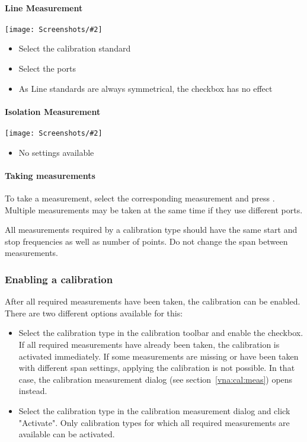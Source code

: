 \documentclass[a4paper,11pt]{article}
\newcommand\info[1][5ex]{%
  \renewcommand\stacktype{L}%
  \scaleto{\stackon[1.2pt]{\color{blue}$\bigcirc$}{\raisebox{-1.5pt}{\small i}}}{#1}%
}
\newenvironment{information}[1][]{%
   \begin{mdframed}[%
      backgroundcolor={blue!15}, hidealllines=true,
      skipabove=0.7\baselineskip, skipbelow=0.7\baselineskip,
      splitbottomskip=2pt, splittopskip=4pt, #1]%
   \makebox[0pt]{%
      \smash{%
         \hspace*{-45pt}%
         \raisebox{-5pt}{%
            {\info}%
         }%
      }%
   }%
}{\end{mdframed}}
\newcommand{\screenshot}[2]{\begin{center}
\texttt{[image: Screenshots/\#2]}
\end{center}}
\begin{document}
\paragraph{Line Measurement}
\screenshot{1.0}{LineMeasurement.png}
\begin{itemize}
\item Select the calibration standard
\item Select the ports
\item As Line standards are always symmetrical, the checkbox has no effect
\end{itemize}

\paragraph{Isolation Measurement}
\screenshot{1.0}{IsolationMeasurement.png}
\begin{itemize}
\item No settings available
\end{itemize}

\paragraph{Taking measurements}
To take a measurement, select the corresponding measurement and press . Multiple measurements may be taken at the same time if they use different ports.
\begin{information}
All measurements required by a calibration type should have the same start and stop frequencies as well as number of points. Do not change the span between measurements.
\end{information}

\subsubsection{Enabling a calibration}
After all required measurements have been taken, the calibration can be enabled. There are two different options available for this:
\begin{itemize}
\item Select the calibration type in the calibration toolbar and enable the checkbox. If all required measurements have already been taken, the calibration is activated immediately. If some measurements are missing or have been taken with different span settings, applying the calibration is not possible. In that case, the calibration measurement dialog (see section~\ref{vna:cal:meas}) opens instead.
\item Select the calibration type in the calibration measurement dialog and click "Activate". Only calibration types for which all required measurements are available can be activated.
\end{itemize}
\end{document}
